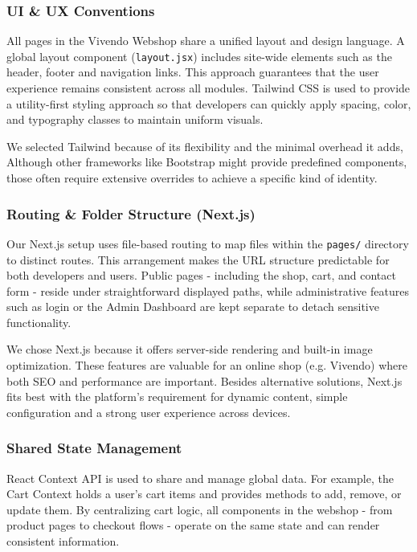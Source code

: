 \subsubsection{UI \& UX Conventions}
All pages in the Vivendo Webshop share a unified layout and design language. A global layout component (\texttt{layout.jsx}) includes site-wide elements such as the header, footer and navigation links. This approach guarantees that the user experience remains consistent across all modules. Tailwind CSS is used to provide a utility-first styling approach so that developers can quickly apply spacing, color, and typography classes to maintain uniform visuals. 

We selected Tailwind because of its flexibility and the minimal overhead it adds, Although other frameworks like Bootstrap might provide predefined components, those often require extensive overrides to achieve a specific kind of identity. 

\subsubsection{Routing \& Folder Structure (Next.js)}
Our Next.js setup uses file-based routing to map files within the \texttt{pages/} directory to distinct routes. This arrangement makes the URL structure predictable for both developers and users. Public pages - including the shop, cart, and contact form - reside under straightforward displayed paths, while administrative features such as login or the Admin Dashboard are kept separate to detach sensitive functionality.

We chose Next.js because it offers server-side rendering and built-in image optimization. These features are valuable for an online shop (e.g. Vivendo) where both SEO and performance are important. Besides alternative solutions, Next.js fits best with the platform's requirement for dynamic content, simple configuration and a strong user experience across devices.

\subsubsection{Shared State Management}
React Context API is used to share and manage global data. For example, the Cart Context holds a user’s cart items and provides methods to add, remove, or update them. By centralizing cart logic, all components in the webshop - from product pages to checkout flows - operate on the same state and can render consistent information. 

